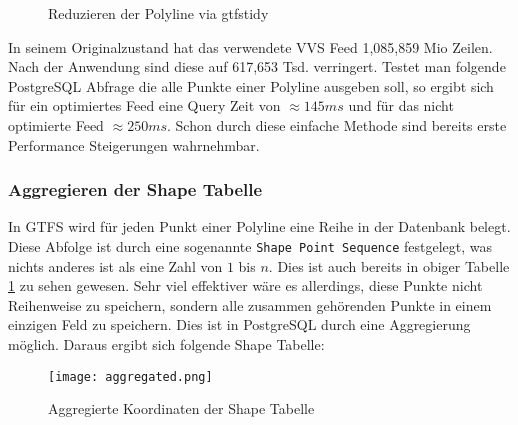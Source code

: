     \begin{figure}[htbp]
      \centering
      \hfill
      \caption{Reduzieren der Polyline via gtfstidy}
      \label{fig:shape_simplify}
    \end{figure}

    In seinem Originalzustand hat das verwendete VVS Feed 1,085,859 Mio Zeilen. Nach der Anwendung sind diese auf 617,653 Tsd. verringert. Testet man folgende PostgreSQL Abfrage
    \colorbox{materialGrey}{\texttt{}}
    die alle Punkte einer Polyline ausgeben soll, so ergibt sich für ein optimiertes Feed eine Query Zeit von $\approx145 ms$ und für das nicht optimierte Feed $\approx250 ms$. Schon durch diese einfache Methode sind bereits erste Performance Steigerungen wahrnehmbar.


  \subsubsection*{Aggregieren der Shape Tabelle}
  \label{ssub:aggregieren_der_shape_tabelle}
    In GTFS wird für jeden Punkt einer Polyline eine Reihe in der Datenbank belegt. Diese Abfolge ist durch eine sogenannte \texttt{Shape Point Sequence} festgelegt, was nichts anderes ist als eine Zahl von $1$ bis $n$. Dies ist auch bereits in obiger Tabelle \ref{fig:shape_simplify} zu sehen gewesen. Sehr viel effektiver wäre es allerdings, diese Punkte nicht Reihenweise zu speichern, sondern alle zusammen gehörenden Punkte in einem einzigen Feld zu speichern. Dies ist in PostgreSQL durch eine Aggregierung möglich. Daraus ergibt sich folgende Shape Tabelle:

    \begin{figure}[htbp]
      \begin{center}
        \texttt{[image: aggregated.png]}
        \caption{Aggregierte Koordinaten der Shape Tabelle}
        \label{fig:aggregated}
      \end{center}
    \end{figure}

